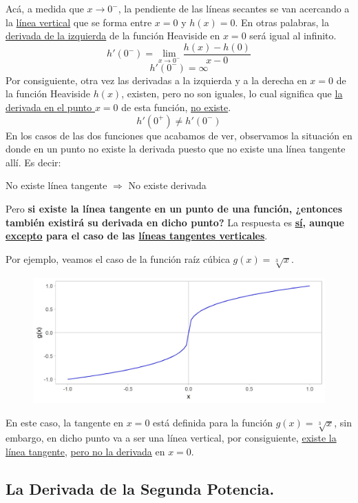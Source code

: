 \documentclass[12pt]{article}
\begin{document}
Acá, a medida que $x \to 0^{-}$, la pendiente de las líneas secantes se van acercando a la \underline{línea vertical} que se forma entre $x = 0$ y $h(x) = 0$. En otras palabras, la \underline{derivada de la izquierda} de la función Heaviside en $x = 0$ será igual al infinito.
\[h'(0^{-}) = \lim_{x \to 0^{-}} \frac{h(x)-h(0)}{x-0}\]
\[h'(0^{-}) = \infty\]
Por consiguiente, otra vez las derivadas a la izquierda y a la derecha en $x = 0$ de la función Heaviside $h(x)$, existen, pero no son iguales, lo cual significa que \underline{la derivada en el punto $x = 0$} de esta función, \underline{no existe}.
\[h'(0^{+}) \neq h'(0^{-})\]
En los casos de las dos funciones que acabamos de ver, observamos la situación en donde en un punto no existe la derivada puesto que no existe una línea tangente allí. Es decir:

\centerline{No existe línea tangente $\Rightarrow$ No existe derivada}

Pero \textbf{si existe la línea tangente en un punto de una función, ¿entonces también existirá su derivada en dicho punto?} La respuesta es \textbf{\underline{sí}, aunque \underline{excepto} para el caso de las \underline{líneas tangentes verticales}}.

Por ejemplo, veamos el caso de la función raíz cúbica $g(x) = \sqrt[3]{x}$.

\begin{figure}[hbt!]
\centering
\includegraphics[scale=0.7]{img/cubic_root_plot.jpg}
\end{figure}

En este caso, la tangente en $x = 0$ está definida para la función $g(x) = \sqrt[3]{x}$, sin embargo, en dicho punto va a ser una línea vertical, por consiguiente, \underline{existe la línea tangente}, \underline{pero no la derivada} en $x = 0$.


\subsection{La Derivada de la Segunda Potencia.}
\end{document}
